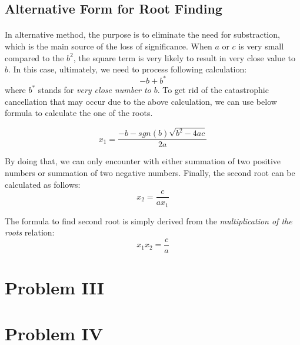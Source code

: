 \documentclass[letterpaper,12pt]{article}
\begin{document}
\subsection{Alternative Form for Root Finding}
\paragraph{}In alternative method, the purpose is to eliminate the need for substraction, which is the main source of the loss of significance. When $a$ or $c$ is very small compared to the $b^2$, the square term is very likely to result in very close value to $b$. In this case, ultimately, we need to process following calculation:
\begin{equation*}
   -b + b^*
\end{equation*}
where $b^*$ stands for \textit{very close number to $b$}. To get rid of the catastrophic cancellation that may occur due to the above calculation, we can use below formula to calculate the one of the roots.

\begin{equation*}
   x_{1} = \frac{-b - sgn(b)\sqrt{b^2 - 4ac}}{2a}
\end{equation*}

By doing that, we can only encounter with either summation of two positive numbers or summation of two negative numbers. Finally, the second root can be calculated as follows:
\begin{equation*}
   x_{2} = \frac{c}{a x_1}
\end{equation*}

The formula to find second root is simply derived from the \textit{multiplication of the roots} relation:
\begin{equation*}
   x_1x_{2} = \frac{c}{a}
\end{equation*}

\section{Problem III}
\section{Problem IV}
\end{document}
